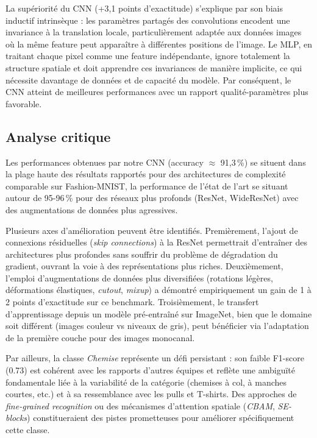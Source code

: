 \documentclass[11pt,a4paper]{article}
\begin{document}
La supériorité du CNN (+3,1 points d'exactitude) s'explique par son biais inductif
intrinsèque : les paramètres partagés des convolutions encodent une invariance à la
translation locale, particulièrement adaptée aux données images où la même feature
peut apparaître à différentes positions de l'image. Le MLP, en traitant chaque pixel
comme une feature indépendante, ignore totalement la structure spatiale et doit apprendre
ces invariances de manière implicite, ce qui nécessite davantage de données et de capacité
du modèle. Par conséquent, le CNN atteint de meilleures performances avec un rapport
qualité-paramètres plus favorable.

\subsection{Analyse critique}

Les performances obtenues par notre CNN (accuracy $\approx$ 91,3\,\%) se situent dans
la plage haute des résultats rapportés pour des architectures de complexité comparable
sur Fashion-MNIST, la performance de l'état de l'art se situant autour de 95-96\,\%
pour des réseaux plus profonds (ResNet, WideResNet) avec des augmentations de données
plus agressives.

Plusieurs axes d'amélioration peuvent être identifiés. Premièrement, l'ajout de
connexions résiduelles (\textit{skip connections}) à la ResNet permettrait d'entraîner
des architectures plus profondes sans souffrir du problème de dégradation du gradient,
ouvrant la voie à des représentations plus riches. Deuxièmement, l'emploi d'augmentations
de données plus diversifiées (rotations légères, déformations élastiques, \textit{cutout},
\textit{mixup}) a démontré empiriquement un gain de 1 à 2 points d'exactitude sur ce
benchmark. Troisièmement, le transfert d'apprentissage depuis un modèle pré-entraîné
sur ImageNet, bien que le domaine soit différent (images couleur vs niveaux de gris),
peut bénéficier via l'adaptation de la première couche pour des images monocanal.

Par ailleurs, la classe \textit{Chemise} représente un défi persistant : son faible
F1-score (0.73) est cohérent avec les rapports d'autres équipes et reflète une ambiguïté
fondamentale liée à la variabilité de la catégorie (chemises à col, à manches courtes,
etc.) et à sa ressemblance avec les pulls et T-shirts. Des approches de \textit{fine-grained
recognition} ou des mécanismes d'attention spatiale (\textit{CBAM}, \textit{SE-blocks})
constitueraient des pistes prometteuses pour améliorer spécifiquement cette classe.
\end{document}
